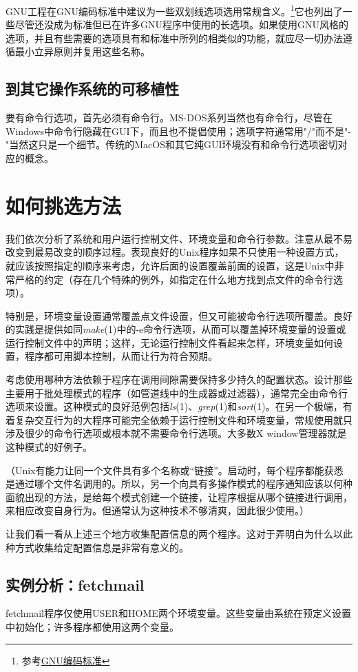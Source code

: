 \documentclass[12pt,oneside]{book}
\begin{document}
\begin{common-format}
GNU工程在GNU编码标准中建议为一些双划线选项选用常规含义。\footnote{参考\href{http://www.gnu.org/prep/standards.html}{GNU编码标准}}它也列出了一些尽管还没成为标准但已在许多GNU程序中使用的长选项。如果使用GNU风格的选项，并且有些需要的选项具有和标准中所列的相类似的功能，就应尽一切办法遵循最小立异原则并复用这些名称。

\subsection{到其它操作系统的可移植性}
要有命令行选项，首先必须有命令行。MS-DOS系列当然也有命令行，尽管在Windows中命令行隐藏在GUI下，而且也不提倡使用；选项字符通常用"/"而不是"-"当然这只是一个细节。传统的MacOS和其它纯GUI环境没有和命令行选项密切对应的概念。


\section{如何挑选方法}
我们依次分析了系统和用户运行控制文件、环境变量和命令行参数。注意从最不易改变到最易改变的顺序过程。表现良好的Unix程序如果不只使用一种设置方式，就应该按照指定的顺序来考虑，允许后面的设置覆盖前面的设置，这是Unix中非常严格的约定（存在几个特殊的例外，如指定在什么地方找到点文件的命令行选项）。

特别是，环境变量设置通常覆盖点文件设置，但又可能被命令行选项所覆盖。良好的实践是提供如同\textit{make}(1)中的-e命令行选项，从而可以覆盖掉环境变量的设置或运行控制文件中的声明；这样，无论运行控制文件看起来怎样，环境变量如何设置，程序都可用脚本控制，从而让行为符合预期。

考虑使用哪种方法依赖于程序在调用间隙需要保持多少持久的配置状态。设计那些主要用于批处理模式的程序（如管道线中的生成器或过滤器），通常完全由命令行选项来设置。这种模式的良好范例包括\textit{ls}(1)、\textit{grep}(1)和\textit{sort}(1)。在另一个极端，有着复杂交互行为的大程序可能完全依赖于运行控制文件和环境变量，常规使用就只涉及很少的命令行选项或根本就不需要命令行选项。大多数X window管理器就是这种模式的好例子。

（Unix有能力让同一个文件具有多个名称或“链接”。启动时，每个程序都能获悉是通过哪个文件名调用的。所以，另一个向具有多操作模式的程序通知应该以何种面貌出现的方法，是给每个模式创建一个链接，让程序根据从哪个链接进行调用，来相应改变自身行为。但通常认为这种技术不够清爽，因此很少使用。）

让我们看一看从上述三个地方收集配置信息的两个程序。这对于弄明白为什么以此种方式收集给定配置信息是非常有意义的。

\subsection{实例分析：fetchmail}
fetchmail程序仅使用USER和HOME两个环境变量。这些变量由系统在预定义设置中初始化；许多程序都使用这两个变量。


\end{common-format}
\end{document}
